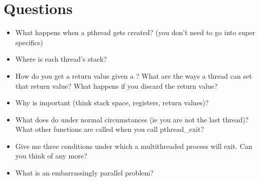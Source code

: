 \section{Questions}\label{questions}

\begin{itemize}
\tightlist
\item
  What happens when a pthread gets created? (you don't need to go into super specifics)
\item
  Where is each thread's stack?
\item
  How do you get a return value given a ? What are the ways a thread can set that return value? What happens if you discard the return value?
\item
  Why is  important (think stack space, registers, return values)?
\item
  What does  do under normal circumstances (ie you are not the last thread)? What other functions are called when you call pthread\_exit?
\item
  Give me three conditions under which a multithreaded process will exit. Can you think of any more?
\item
  What is an embarrassingly parallel problem?
\end{itemize}



